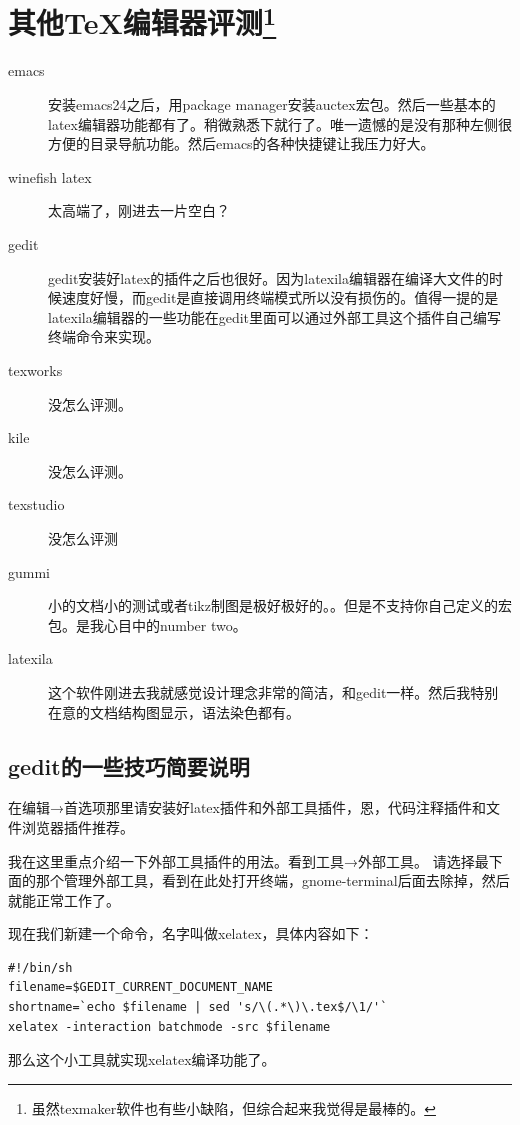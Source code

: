 \documentclass[11pt,oneside]{book}
\begin{document}
\section[其他\TeX 编辑器评测]{其他\TeX 编辑器评测\footnote{虽然texmaker软件也有些小缺陷，但综合起来我觉得是最棒的。}}
\begin{description}
\item[emacs] 安装emacs24之后，用package manager安装auctex宏包。然后一些基本的latex编辑器功能都有了。稍微熟悉下就行了。唯一遗憾的是没有那种左侧很方便的目录导航功能。然后emacs的各种快捷键让我压力好大。
\item[winefish latex] 太高端了，刚进去一片空白？
\item[gedit] gedit安装好latex的插件之后也很好。因为latexila编辑器在编译大文件的时候速度好慢，而gedit是直接调用终端模式所以没有损伤的。值得一提的是latexila编辑器的一些功能在gedit里面可以通过外部工具这个插件自己编写终端命令来实现。
\item[texworks] 没怎么评测。
\item[kile] 没怎么评测。
\item[texstudio] 没怎么评测
\item[gummi] 小的文档小的测试或者tikz制图是极好极好的。。但是不支持你自己定义的宏包。是我心目中的number two。
\item[latexila] 这个软件刚进去我就感觉设计理念非常的简洁，和gedit一样。然后我特别在意的文档结构图显示，语法染色都有。
\end{description}


\subsection{gedit的一些技巧简要说明}
在编辑→首选项那里请安装好latex插件和外部工具插件，恩，代码注释插件和文件浏览器插件推荐。

我在这里重点介绍一下外部工具插件的用法。看到工具→外部工具。
请选择最下面的那个管理外部工具，看到在此处打开终端，gnome-terminal后面去除掉，然后就能正常工作了。

现在我们新建一个命令，名字叫做xelatex，具体内容如下：
\begin{Verbatim}
#!/bin/sh
filename=$GEDIT_CURRENT_DOCUMENT_NAME
shortname=`echo $filename | sed 's/\(.*\)\.tex$/\1/'`
xelatex -interaction batchmode -src $filename
\end{Verbatim}
那么这个小工具就实现xelatex编译功能了。
\end{document}
